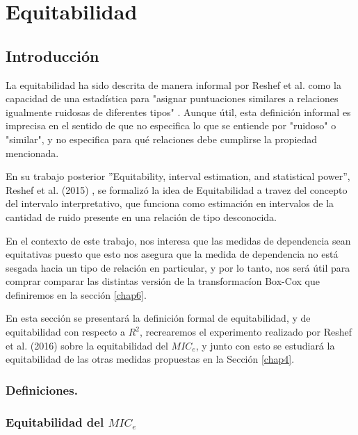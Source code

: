 \chapter{Equitabilidad}\label{chap5}

	\section{Introducci\'on}

	La equitabilidad ha sido descrita de manera informal por Reshef et al. como la capacidad de una estadística para "asignar puntuaciones similares a relaciones igualmente ruidosas de diferentes tipos" \cite{Reshef2011}. Aunque útil, esta definición informal es imprecisa en el sentido de que no especifica lo que se entiende por "ruidoso" o "similar", y no especifica para qué relaciones debe cumplirse la propiedad mencionada.

	En su trabajo posterior  ''Equitability, interval estimation, and statistical power'', Reshef et al. (2015) \cite{Reshef2015}, se formaliz\'o la idea de Equitabilidad a travez del concepto del intervalo interpretativo, que funciona como estimaci\'on en intervalos de la cantidad de ruido presente en una relaci\'on de tipo desconocida. 

	En el contexto de este trabajo, nos interesa que las medidas de dependencia sean equitativas puesto que esto nos asegura que la medida de dependencia no est\'a sesgada hacia un tipo de relaci\'on en particular, y por lo tanto, nos ser\'a \'util para comprar comparar las distintas versi\'on de la transformac\'ion Box-Cox que definiremos en la secci\'on \ref{chap6}.

	En esta secci\'on se presentar\'a la definici\'on formal de equitabilidad, y de equitabilidad con respecto a $R^2$, recrearemos el experimento realizado por Reshef et al. (2016) \cite{Reshef2016} sobre la equitabilidad del $MIC_e$, y junto con esto se estudiar\'a la equitabilidad de las otras medidas propuestas en la Secci\'on \ref{chap4}. 

	\subsection[equidefiniciones]{Definiciones.}

	\subsection[equitabilidadmice]{Equitabilidad del $MIC_e$}

